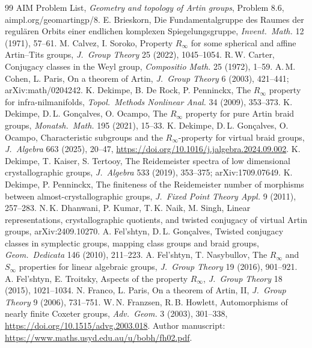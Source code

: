 \documentclass[11pt]{amsart}
\theoremstyle{definition}
\begin{document}
\begin{thebibliography}{99}
 AIM Problem List, \emph{Geometry and topology of Artin groups}, Problem 8.6, aimpl.org/geomartingp/8.
 E. Brieskorn, Die Fundamentalgruppe des Raumes der regul\"aren Orbits einer endlichen komplexen Spiegelungsgruppe, \emph{Invent.\ Math.} 12 (1971), 57--61.
 M. Calvez, I. Soroko, Property $R_\infty$ for some spherical and affine Artin--Tits groups, \emph{J.\ Group Theory} 25 (2022), 1045--1054.
 R.\,W. Carter, Conjugacy classes in the Weyl group, \emph{Compositio Math.} 25 (1972), 1--59.
 A.\,M. Cohen, L. Paris, On a theorem of Artin, \emph{J.\ Group Theory} 6 (2003), 421--441; arXiv:math/0204242.
 K. Dekimpe, B. De Rock, P. Penninckx, The $R_\infty$ property for infra-nilmanifolds, \emph{Topol.\ Methods Nonlinear Anal.} 34 (2009), 353--373.
 K. Dekimpe, D.\,L. Gon\c{c}alves, O. Ocampo, The $R_\infty$ property for pure Artin braid groups, \emph{Monatsh.\ Math.} 195 (2021), 15--33.
 K. Dekimpe, D.\,L. Gon\c{c}alves, O. Ocampo, Characteristic subgroups and the $R_\infty$-property for virtual braid groups, \emph{J.\ Algebra} 663 (2025), 20--47, \url{https://doi.org/10.1016/j.jalgebra.2024.09.002}.
 K. Dekimpe, T. Kaiser, S. Tertooy, The Reidemeister spectra of low dimensional crystallographic groups, \emph{J.\ Algebra} 533 (2019), 353--375; arXiv:1709.07649.
 K. Dekimpe, P. Penninckx, The finiteness of the Reidemeister number of morphisms between almost-crystallographic groups, \emph{J.\ Fixed Point Theory Appl.} 9 (2011), 257--283.
 N.\,K. Dhanwani, P. Kumar, T.\,K. Naik, M. Singh, Linear representations, crystallographic quotients, and twisted conjugacy of virtual Artin groups, arXiv:2409.10270.
 A. Fel'shtyn, D.\,L. Gon\c{c}alves, Twisted conjugacy classes in symplectic groups, mapping class groups and braid groups, \emph{Geom.\ Dedicata} 146 (2010), 211--223.
 A. Fel'shtyn, T. Nasybullov, The $R_\infty$ and $S_\infty$ properties for linear algebraic groups, \emph{J.\ Group Theory} 19 (2016), 901--921.
 A. Fel'shtyn, E. Troitsky, Aspects of the property $R_\infty$, \emph{J.\ Group Theory} 18 (2015), 1021--1034.
 N. Franco, L. Paris, On a theorem of Artin, II, \emph{J.\ Group Theory} 9 (2006), 731--751.
 W.\,N. Franzsen, R.\,B. Howlett, Automorphisms of nearly finite Coxeter groups, \emph{Adv.\ Geom.} 3 (2003), 301--338, \url{https://doi.org/10.1515/advg.2003.018}. Author manuscript: \url{https://www.maths.usyd.edu.au/u/bobh/fh02.pdf}.

\end{thebibliography}
\end{document}
